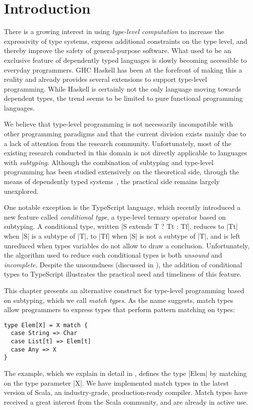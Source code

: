 \section{Introduction}
\label{sec:introduction}

There is a growing interest in using \emph{type-level computation} to increase the expressivity of type systems, express additional constraints on the type level, and thereby improve the safety of general-purpose software.
What used to be an exclusive feature of dependently typed languages is slowly becoming accessible to everyday programmers.
GHC Haskell has been at the forefront of making this a reality and already provides several extensions to support type-level programming.
While Haskell is certainly not the only language moving towards dependent types, the trend seems to be limited to pure functional programming languages.

We believe that type-level programming is not necessarily incompatible with other programming paradigms and that the current division exists mainly due to a lack of attention from the research community.
Unfortunately, most of the existing research conducted in this domain is not directly applicable to languages with \emph{subtyping}.
Although the combination of subtyping and type-level programming has been studied extensively on the theoretical side, through the means of dependently typed systems~\citep{aspinall1994subtyping, zwanenburg1999pure, stone2000deciding, courant2003strong, hutchins2010pure, yang2017unifying}, the practical side remains largely unexplored.

One notable exception is the TypeScript language, which recently introduced a new feature called \emph{conditional type}, a type-level ternary operator based on subtyping.
A conditional type, written |S extends T ? Tt : Tf|, reduces to |Tt| when |S| is a subtype of |T|, to |Tf| when |S| is not a subtype of |T|, and is left unreduced when types variables do not allow to draw a conclusion. Unfortunately, the algorithm used to reduce such conditional types is both \emph{unsound} and \emph{incomplete}.
Despite the unsoundness (discussed in ), the addition of conditional types to TypeScript illustrates the practical need and timeliness of this feature.

This chapter presents an alternative construct for type-level programming based on subtyping, which we call \emph{match types}.
As the name suggests, match types allow programmers to express types that perform pattern matching on types:
%
\begin{lstlisting}
type Elem[X] = X match {
  case String => Char
  case List[t] => Elem[t]
  case Any => X
}
\end{lstlisting}
%
The example, which we explain in detail in , defines the type |Elem| by matching on the type parameter |X|.
%
We have implemented match types in the latest version of Scala, an industry-grade, production-ready compiler.
Match types have received a great interest from the Scala community, and are already in active use.

